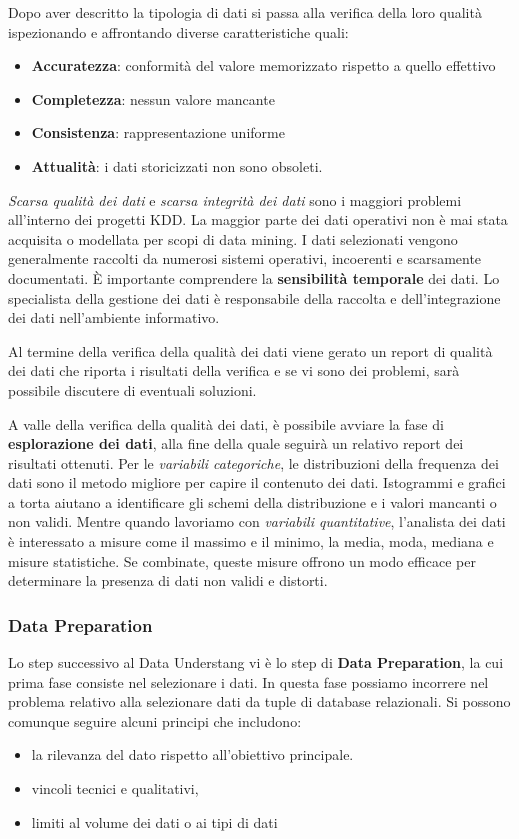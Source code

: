 \documentclass[a4paper]{extarticle}
\begin{document}
Dopo aver descritto la tipologia di dati si passa alla verifica della loro qualità ispezionando e affrontando diverse caratteristiche quali:

\begin{itemize}
\item \textbf{Accuratezza}: conformità del valore memorizzato rispetto a quello effettivo
\item \textbf{Completezza}: nessun valore mancante
\item \textbf{Consistenza}: rappresentazione uniforme
\item \textbf{Attualità}: i dati storicizzati non sono obsoleti.
\end{itemize}

\textit{Scarsa qualità dei dati} e \textit{scarsa integrità dei dati} sono i maggiori problemi all'interno dei progetti KDD. La maggior parte dei dati operativi non è mai stata acquisita o modellata per scopi di data mining. I dati selezionati vengono generalmente raccolti da numerosi sistemi operativi, incoerenti e scarsamente documentati. È importante comprendere la \textbf{sensibilità temporale} dei dati. Lo specialista della gestione dei dati è responsabile della raccolta e dell'integrazione dei dati nell'ambiente informativo. 

Al termine della verifica della qualità dei dati viene gerato un report di qualità dei dati che riporta i risultati della verifica e se vi sono dei problemi, sarà possibile discutere di eventuali soluzioni.

A valle della verifica della qualità dei dati, è possibile avviare la fase di \textbf{esplorazione dei dati}, alla fine della quale seguirà un relativo report dei risultati ottenuti. Per le \textit{variabili categoriche}, le distribuzioni della frequenza dei dati sono il metodo migliore per capire il contenuto dei dati. Istogrammi e grafici a torta aiutano a identificare gli schemi della distribuzione e i valori mancanti o non validi. Mentre quando lavoriamo con \textit{variabili quantitative}, l'analista dei dati è interessato a misure come il massimo e il minimo, la media, moda, mediana e misure statistiche. Se combinate, queste misure offrono un modo efficace per determinare la presenza di dati non validi e distorti.

\subsubsection{Data Preparation}

Lo step successivo al Data Understang vi è lo step di \textbf{Data Preparation}, la cui prima fase consiste nel selezionare i dati. In questa fase possiamo incorrere nel problema relativo alla selezionare dati da tuple di database relazionali. Si possono comunque seguire alcuni principi che includono:
\begin{itemize}
\item la rilevanza del dato rispetto all'obiettivo principale.
\item vincoli tecnici e qualitativi,
\item limiti al volume dei dati o ai tipi di dati
\end{itemize}
\end{document}
